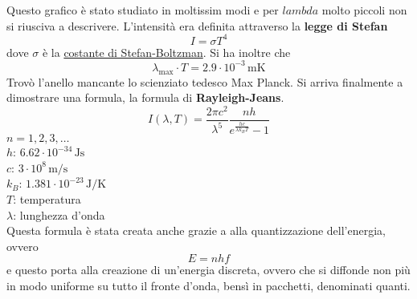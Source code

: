 Questo grafico è stato studiato in moltissim modi e per $lambda$ molto piccoli non si riusciva a
descrivere. L'intensità era definita attraverso la \textbf{legge di Stefan}
\begin{equation*}
  I = \sigma T^4
\end{equation*}
dove $\sigma$ è la \hyperref[tab:sigma]{costante di Stefan-Boltzman}. Si ha inoltre che
\begin{equation*}
  \lambda_{\text{max}}\cdot T=2.9\cdot10^{-3}\,\text{mK}
\end{equation*}
Trovò l'anello mancante lo scienziato tedesco Max Planck. Si arriva finalmente a dimostrare una 
formula, la formula di \textbf{Rayleigh-Jeans}.
\begin{equation*}
  I(\lambda,T) = \frac{2\pi c^2}{\lambda^5} \frac{nh}{e^{\frac{hc}{\lambda k_B T}}-1}
\end{equation*}
$n=1,2,3,\ldots$\\
\hyperref[tab:h]{$h$}: $6.62\cdot10^{-34}\,\text{Js}$\\
\hyperref[tab:c]{$c$}: $3\cdot10^8\,\text{m/s}$\\
\hyperref[tab:kB]{$k_B$}: $1.381\cdot10^{-23}\,\text{J/K}$\\
$T$: temperatura\\
$\lambda$: lunghezza d'onda\\ [\baselineskip]
Questa formula è stata creata anche grazie a alla quantizzazione dell'energia, ovvero
\begin{equation*}
  E = nhf
\end{equation*}
e questo porta alla creazione di un'energia discreta, ovvero che si diffonde non più in modo uniforme
su tutto il fronte d'onda, bensì in pacchetti, denominati quanti.

